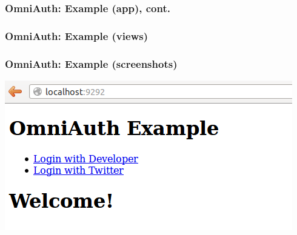 \documentclass{beamer}
\begin{document}
\begin{frame}\frametitle{OmniAuth: Example (app), cont.} 

  
  
\end{frame}




\begin{frame}\frametitle{OmniAuth: Example (views)} 

  

  
    
\end{frame}



\begin{frame}\frametitle{OmniAuth: Example (screenshots)} 

  \begin{center}
    \includegraphics[scale=0.5]{images/oauth1.png}  
  \end{center}
    
\end{frame}

      
\end{document}
